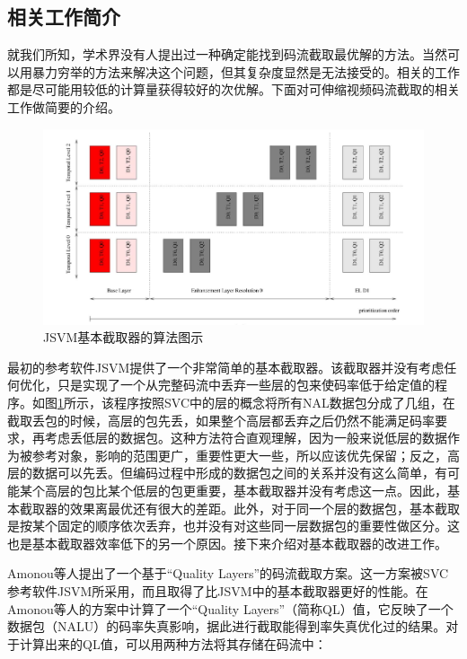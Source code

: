 \subsection{相关工作简介}

就我们所知，学术界没有人提出过一种确定能找到码流截取最优解的方法。当然可以用暴力穷举的方法来解决这个问题，但其复杂度显然是无法接受的。相关的工作都是尽可能用较低的计算量获得较好的次优解。下面对可伸缩视频码流截取的相关工作做简要的介绍。

\begin{figure}[h]
	\centering
	\includegraphics[width = 1.0\linewidth]{clip/06.png}
	\caption{JSVM基本截取器的算法图示\label{fig:06}}
\end{figure}

最初的参考软件JSVM提供了一个非常简单的基本截取器。该截取器并没有考虑任何优化，只是实现了一个从完整码流中丢弃一些层的包来使码率低于给定值的程序。如图\ref{fig:06}所示，该程序按照SVC中的层的概念将所有NAL数据包分成了几组，在截取丢包的时候，高层的包先丢，如果整个高层都丢弃之后仍然不能满足码率要求，再考虑丢低层的数据包。这种方法符合直观理解，因为一般来说低层的数据作为被参考对象，影响的范围更广，重要性更大一些，所以应该优先保留；反之，高层的数据可以先丢。但编码过程中形成的数据包之间的关系并没有这么简单，有可能某个高层的包比某个低层的包更重要，基本截取器并没有考虑这一点。因此，基本截取器的效果离最优还有很大的差距。此外，对于同一个层的数据包，基本截取是按某个固定的顺序依次丢弃，也并没有对这些同一层数据包的重要性做区分。这也是基本截取器效率低下的另一个原因。接下来介绍对基本截取器的改进工作。

Amonou等人\supercite{Amonou2007}提出了一个基于“Quality Layers”的码流截取方案。这一方案被SVC参考软件JSVM所采用，而且取得了比JSVM中的基本截取器更好的性能。在Amonou等人的方案中计算了一个“Quality Layers”（简称QL）值，它反映了一个数据包（NALU）的码率失真影响，据此进行截取能得到率失真优化过的结果。对于计算出来的QL值，可以用两种方法将其存储在码流中：

